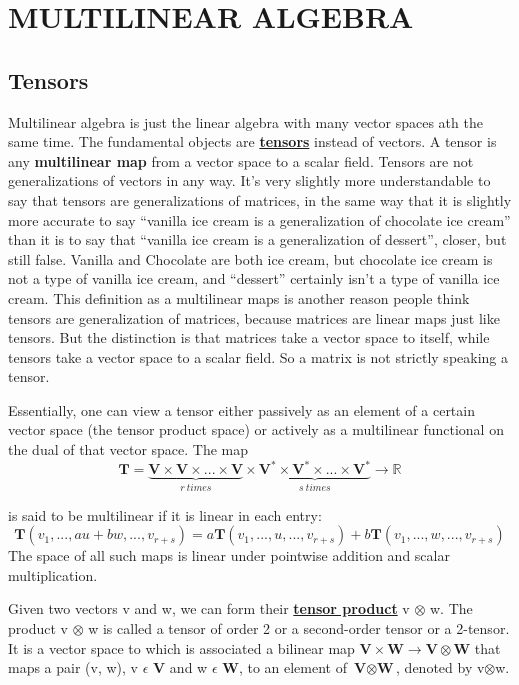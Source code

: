 \section{MULTILINEAR ALGEBRA}
\subsection{Tensors}
Multilinear algebra is just the linear algebra with many vector spaces ath the same time.
The fundamental objects are \href{https://www.quora.com/What-is-a-tensor}{\textbf{tensors}} instead of vectors.
A tensor is any \textbf{multilinear map} from a vector space to a scalar field.
Tensors are not generalizations of vectors in any way. It's very slightly more understandable to say that tensors are generalizations of matrices, in the same way that it is slightly more accurate to say “vanilla ice cream is a generalization of chocolate ice cream” 
than it is to say that “vanilla ice cream is a generalization of dessert”, closer, but still false. 
Vanilla and Chocolate are both ice cream, but chocolate ice cream is not a type of vanilla ice cream, and “dessert” certainly isn't a type of vanilla ice cream.
This definition as a multilinear maps is another reason people think tensors are generalization of matrices, because matrices are linear maps just like tensors. 
But the distinction is that matrices take a vector space to itself, while tensors take a vector space to a scalar field. 
So a matrix is not strictly speaking a tensor.

Essentially, one can view a tensor
either passively as an element of a certain vector space (the tensor product space)
or actively as a multilinear functional on the dual of that vector space. The map
\begin{equation}
    \textbf{T} = \underbrace{\textbf{V} \times \textbf{V} \times ... \times \textbf{V}}_{r \:times} \times \underbrace{\textbf{V}^* \times \textbf{V}^* \times ... \times \textbf{V}^*}_{s\: times} \rightarrow \mathbb{R} 
\end{equation}

is said to be multilinear if it is linear in each entry:
\begin{equation}
    \textbf{T} (v_1, . . . , au + bw, . . . , v_{r +s} ) = a\textbf{T} (v_1, . . . , u, . . . , v_{r +s} ) + b\textbf{T} (v_1, . . . , w, . . . , v_{r +s} )
\end{equation}
The space of all such maps is linear under pointwise addition and scalar
multiplication.

Given two vectors v and w, we can form their \href{http://web.math.ucsb.edu/~jhateley/project/tensor.pdf}{\textbf{tensor product}}
v $\otimes$ w. The product v $\otimes$ w is called a tensor of order 2 or a second-order tensor or a 2-tensor.
It is a vector space to which is associated a bilinear map $\textbf{V} \times \textbf{W} \rightarrow \textbf{V} \otimes \textbf{W}$
that maps a pair (v, w), v $\epsilon$ \textbf{V} and w $\epsilon$ \textbf{W}, to an element of $\textbf{V} \otimes \textbf{W}$, denoted by v$\otimes$w.

